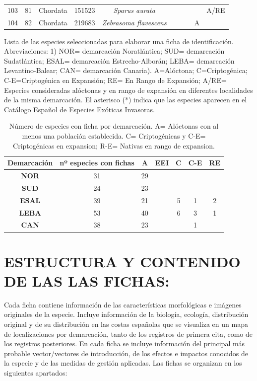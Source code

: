 \documentclass{article}
\begin{document}
\begin{landscape}
\begin{center}
\begin{longtable}{|c|c|c|c|c|c|c|c|c|c|}
103&81&Chordata&151523&\textit{Sparus aurata}&&&&&A/RE\\
104&82&Chordata&219683&\textit{Zebrasoma flavescens}&&&&A&\\
\hline
\end{longtable}
\end{center}
\caption{Lista de las especies seleccionadas para elaborar una ficha de identificación. Abreviaciones: 1) NOR= demarcación Noratlántica; SUD= demarcación Sudatlántica; ESAL= demarcación Estrecho-Alborán; LEBA= demarcación Levantino-Balear; CAN= demarcación Canaria).  A=Alóctona; C=Criptogénica; C-E=Criptogénica en Expansión; RE= En Rango de Expansión; A/RE= Especies consideradas alóctonas y en rango de expansión en diferentes localidades de la misma demarcación. El asterisco (*) indica que las especies aparecen en el Catálogo Español de Especies Exóticas Invasoras.}
\label{table1}
\end{landscape}
\clearpage


\begin{table}[h!]
\begin{center}
\begin{tabular}{ |c|c|c|c|c|c|c| }
\hline
\rowcolor{green!70!yellow!40}
\textbf{Demarcación}& \textbf{nº especies con fichas}& \textbf{A}& \textbf{EEI}& \textbf{C}& \textbf{C-E}& \textbf{RE} \\
\hline
\textbf{NOR}&	31&	29&	&	& &	\\
\hline
\textbf{SUD}&	24&	23&	&	& &	 \\	 
\hline
\textbf{ESAL}&	39&	21&	&	5&	1&	2 \\
\hline
\textbf{LEBA}&	53&	40&	&	6&	3&	1 \\
\hline
\textbf{CAN}&	38&	23&	&	& 1& \\
\hline
\end{tabular}
\end{center}
\caption{Número de especies con ficha por demarcación. A= Alóctonas con al menos una población establecida. C= Criptogénicas y C-E=  Criptogénicas en expansion; R-E= Nativas en rango de expansion.}
\label{table2}
\end{table}

\section*{\normalsize{ESTRUCTURA Y CONTENIDO DE LAS LAS FICHAS:}}
Cada ficha contiene información de las características morfológicas e imágenes originales de la especie. Incluye información de la biología, ecología, distribución original y de su distribución en las costas españolas que se visualiza en un mapa de localizaciones por demarcación, tanto de los registros de primera cita, como de los registros posteriores. En cada ficha se incluye información del principal más probable vector/vectores de introducción, de los efectos e impactos conocidos de la especie y de las medidas de gestión aplicadas. 
Las fichas se organizan en los siguientes apartados:
\end{document}
